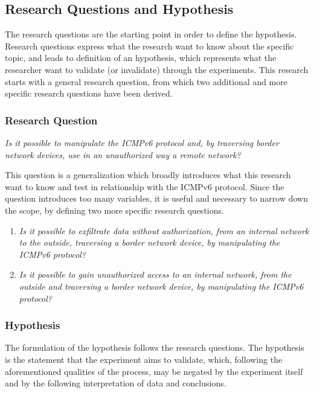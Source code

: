 \documentclass[12pt]{article}
\begin{document}
\subsection{Research Questions and Hypothesis}
\label{sub:reearchQandH}

The research questions are the starting point in order to define the hypothesis. Research questions express what the research want to know about the specific topic, and leads to definition of an hypothesis, which represents what the researcher want to validate (or invalidate) through the experiments. This research starts with a general research question, from which two additional and more specific research questions have been derived.

\subsubsection{Research Question}
\label{subsub:researchQ}

\textit{Is it possible to manipulate the ICMPv6 protocol and, by traversing border network devices, use in an unauthorized way a remote network?}

This question is a generalization which broadly introduces what this research want to know and test in relationship with the ICMPv6 protocol. Since the question introduces too many variables, it is useful and necessary to narrow down the scope, by defining two more specific research questions.
\begin{enumerate}
 \item \textit{Is it possible to exfiltrate data without authorization, from an internal network to the outside, traversing a border network device, by manipulating the ICMPv6 protocol?}
 \item \textit{Is it possible to gain unauthorized access to an internal network, from the outside and traversing a border network device, by manipulating the ICMPv6 protocol?}
\end{enumerate}

\subsubsection{Hypothesis}
\label{subsub:hypothesis}

The formulation of the hypothesis follows the research questions. The hypothesis is the statement that the experiment aims to validate, which, following the aforementioned qualities of the process, may be negated by the experiment itself and by the following interpretation of data and conclusions.
\end{document}
